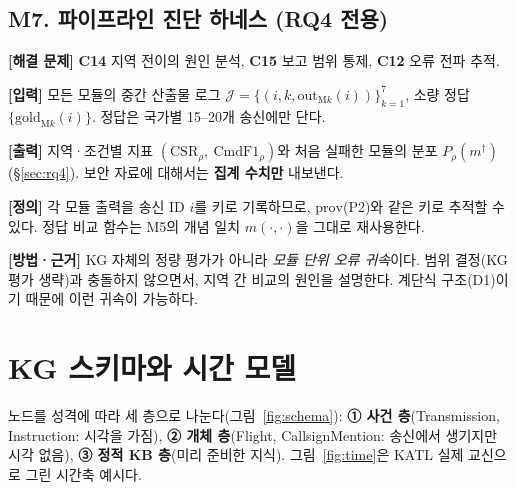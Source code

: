 \documentclass[10pt,a4paper]{article}
\newcommand{\ch}[1]{\textbf{\textcolor{red!60!black}{#1}}}
\begin{document}
\subsection{M7. 파이프라인 진단 하네스 (RQ4 전용)}
\textbf{[해결 문제]} \ch{C14} 지역 전이의 원인 분석, \ch{C15} 보고 범위 통제, \ch{C12} 오류 전파 추적.

\textbf{[입력]} 모든 모듈의 중간 산출물 로그 $\mathcal{J}=\{(i, k, \mathrm{out}_{\mathrm{M}k}(i))\}_{k=1}^{7}$, 소량 정답 $\{\mathrm{gold}_{\mathrm{M}k}(i)\}$. 정답은 국가별 15--20개 송신에만 단다.

\textbf{[출력]} 지역·조건별 지표 $(\mathrm{CSR}_\rho,\ \mathrm{CmdF1}_\rho)$와 처음 실패한 모듈의 분포 $P_\rho(m^\dagger)$ (\S\ref{sec:rq4}). 보안 자료에 대해서는 \textbf{집계 수치만} 내보낸다.

\textbf{[정의]} 각 모듈 출력을 송신 ID $i$를 키로 기록하므로, $\mathrm{prov}$(P2)와 같은 키로 추적할 수 있다. 정답 비교 함수는 M5의 개념 일치 $m(\cdot,\cdot)$을 그대로 재사용한다.

\textbf{[방법·근거]} KG 자체의 정량 평가가 아니라 \emph{모듈 단위 오류 귀속}이다. 범위 결정(KG 평가 생략)과 충돌하지 않으면서, 지역 간 비교의 원인을 설명한다. 계단식 구조(D1)이기 때문에 이런 귀속이 가능하다.

\clearpage
\section{KG 스키마와 시간 모델}
노드를 성격에 따라 세 층으로 나눈다(그림~\ref{fig:schema}): \textbf{① 사건 층}(Transmission, Instruction: 시각을 가짐), \textbf{② 개체 층}(Flight, CallsignMention: 송신에서 생기지만 시각 없음), \textbf{③ 정적 KB 층}(미리 준비한 지식). 그림~\ref{fig:time}은 KATL 실제 교신으로 그린 시간축 예시다.
\end{document}
